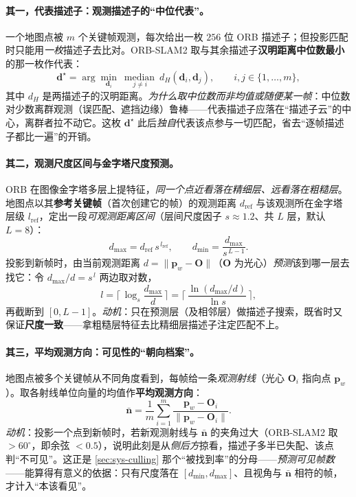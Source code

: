 \paragraph{其一，代表描述子：观测描述子的“中位代表”。}
一个地图点被 $m$ 个关键帧观测，每次给出一枚 $256$ 位 ORB 描述子；但投影匹配时只能用\emph{一枚}描述子去比对。ORB-SLAM2 取与其余描述子\textbf{汉明距离中位数最小}的那一枚作代表：
\begin{equation}
\mathbf{d}^\star=\arg\min_{\mathbf{d}_i}\ \operatorname*{median}_{\,j\ne i}\ d_H(\mathbf{d}_i,\mathbf{d}_j),\qquad i,j\in\{1,\dots,m\},
\label{eq:sys-mp-descriptor}
\end{equation}
其中 $d_H$ 是两描述子的汉明距离。\emph{为什么取中位数而非均值或随便某一帧}：中位数对少数离群观测（误匹配、遮挡边缘）鲁棒——代表描述子应落在“描述子云”的中心，离群者拉不动它。这枚 $\mathbf{d}^\star$ 此后\emph{独自}代表该点参与一切匹配，省去“逐帧描述子都比一遍”的开销。

\paragraph{其二，观测尺度区间与金字塔尺度预测。}
ORB 在图像金字塔多层上提特征，\emph{同一个点近看落在精细层、远看落在粗糙层}。地图点以其\textbf{参考关键帧}（首次创建它的帧）的观测距离 $d_{\mathrm{ref}}$ 与该观测所在金字塔层级 $l_{\mathrm{ref}}$，定出一段\emph{可观测距离区间}（层间尺度因子 $s\approx1.2$、共 $L$ 层，默认 $L{=}8$）：
\begin{equation}
d_{\max}=d_{\mathrm{ref}}\,s^{\,l_{\mathrm{ref}}},\qquad
d_{\min}=\frac{d_{\max}}{s^{\,L-1}} .
\label{eq:sys-mp-scale-range}
\end{equation}
投影到新帧时，由当前观测距离 $d=\lVert\mathbf{p}_w-\mathbf{O}\rVert$（$\mathbf{O}$ 为光心）\emph{预测}该到哪一层去找它：令 $d_{\max}/d=s^{\,l}$ 两边取对数，
\begin{equation}
l=\Big\lceil\,\log_s\frac{d_{\max}}{d}\,\Big\rceil=\Big\lceil\,\frac{\ln(d_{\max}/d)}{\ln s}\,\Big\rceil ,
\label{eq:sys-mp-scale}
\end{equation}
再截断到 $[0,L-1]$。\emph{动机}：只在预测层（及相邻层）做描述子搜索，既省时又保证\textbf{尺度一致}——拿粗糙层特征去比精细层描述子注定匹配不上。

\paragraph{其三，平均观测方向：可见性的“朝向档案”。}
地图点被多个关键帧从不同角度看到，每帧给一条\emph{观测射线}（光心 $\mathbf{O}_i$ 指向点 $\mathbf{p}_w$）。取各射线单位向量的均值作\textbf{平均观测方向}：
\begin{equation}
\bar{\mathbf{n}}=\frac{1}{m}\sum_{i=1}^{m}\frac{\mathbf{p}_w-\mathbf{O}_i}{\lVert\mathbf{p}_w-\mathbf{O}_i\rVert}.
\label{eq:sys-mp-normal}
\end{equation}
\emph{动机}：投影一个点到新帧时，若新观测射线与 $\bar{\mathbf{n}}$ 的夹角过大（ORB-SLAM2 取 $>60^\circ$，即余弦 $<0.5$），说明此刻是从\emph{侧后方}掠看，描述子多半已失配、该点判“不可见”。这正是 \cref{sec:sys-culling} 那个“被找到率”的分母——\emph{预测可见帧数}——能算得有意义的依据：只有尺度落在 $[d_{\min},d_{\max}]$、且视角与 $\bar{\mathbf{n}}$ 相符的帧，才计入“本该看见”。

